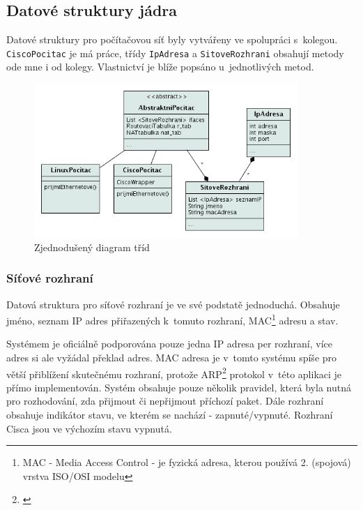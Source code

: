 \subsection{Datové struktury jádra}
Datové struktury pro počítačovou síť byly vytvářeny ve spolupráci s~kolegou. \verb|CiscoPocitac| je má práce, třídy \verb|IpAdresa| a \verb|SitoveRozhrani| obsahují metody ode mne i od kolegy. Vlastnictví je blíže popsáno u~jednotlivých metod.

\begin{figure}[h]
\begin{center}
\includegraphics[width=10cm]{figures/uml_class}
\caption{Zjednodušený diagram tříd}
\label{uml:class}
\end{center}
\end{figure}


\subsubsection{Síťové rozhraní}
Datová struktura pro síťové rozhraní je ve své podstatě jednoduchá. Obsahuje jméno, seznam IP adres přiřazených k~tomuto rozhraní, MAC\footnote{MAC - Media Access Control - je fyzická adresa, kterou používá 2. (spojová) vrstva ISO/OSI modelu} adresu a stav.

Systémem je oficiálně podporována pouze jedna IP adresa per rozhraní, více adres si ale vyžádal překlad adres. MAC adresa je v~tomto systému spíše pro větší přiblížení skutečnému rozhraní, protože ARP\footnote{\cite{wiki:arp}} protokol v~této aplikaci je přímo implementován. Systém obsahuje pouze několik pravidel, která byla nutná pro rozhodování, zda přijmout či nepřijmout příchozí paket. Dále rozhraní obsahuje indikátor stavu, ve kterém se nachází - zapnuté/vypnuté. Rozhraní Cisca jsou ve výchozím stavu vypnutá.

